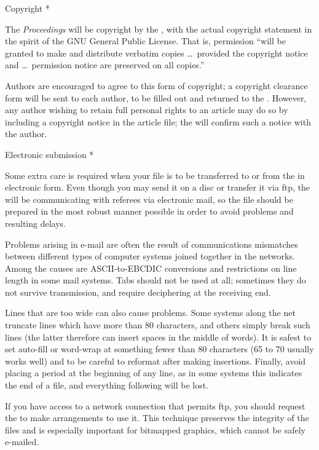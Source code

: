 \head * Copyright *

The {\sl Proceedings\/} will be copyright by the \TUG, with the actual
copyright statement in the spirit of the GNU General Public License.
That is, permission ``will be granted to make and distribute verbatim
copies \dots\ provided the copyright notice and \dots\ permission
notice are preserved on all copies.''

Authors are encouraged to agree to this form of copyright; a copyright
clearance form will be sent to each author, to be filled out and
returned to the \editor.  However, any author wishing to retain full
personal rights to an article may do so by including a copyright notice
in the article file; the \editor{} will confirm such a notice with the
author.

\head * Electronic submission *

Some extra care is required when your file is to be transferred to or
from the \editor{} in electronic form.  Even though you may send it
on a disc or transfer it via ftp, the \editor{} will be communicating
with referees via electronic mail, so the file should be prepared
in the most robust manner possible in order to avoid problems and
resulting delays.

Problems arising in e-mail are often the result of communications
mismatches between different types of computer systems joined together in
the networks.  Among the causes are {\SMC ASCII}-to-{\SMC EBCDIC}
conversions and restrictions on line length in some mail systems.
Tabs should not be used at all; sometimes they do not survive
transmission, and require deciphering at the receiving end.

Lines that are too wide can also cause problems.  Some systems along
the net truncate lines which have more than 80 characters, and others
simply break such lines (the latter therefore can insert spaces in the
middle of words).  It is safest to set auto-fill or word-wrap at
something fewer than 80 characters (65 to 70 usually works well) and to
be careful to reformat after making insertions.  Finally, avoid placing
a period at the beginning of any line, as in some systems this indicates
the end of a file, and everything following will be lost.

If you have access to a network connection that permits ftp, you
should request the \editor{} to make arrangements to use it.  This
technique preserves the integrity of the files and is especially
important for bitmapped graphics, which cannot be safely e-mailed.

